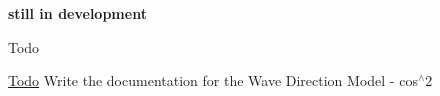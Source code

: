 {\bfseries still in development}

\begin{DoxyRefDesc}{Todo}
\item[\hyperlink{todo__todo000030}{Todo}]Write the documentation for the Wave Direction Model -\/ cos$^\wedge$2\end{DoxyRefDesc}

